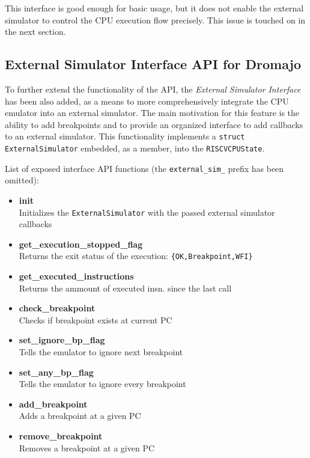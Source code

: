 \noindent
This interface is good enough for basic usage, but it does not enable the external simulator to control the CPU
execution flow precisely. This issue is touched on in the next section.

\pagebreak

\subsection{External Simulator Interface API for Dromajo}

To further extend the functionality of the API, the \textit{External Simulator Interface} has been also added, as a
means to more comprehensively integrate the CPU emulator into an external simulator. The main motivation for this
feature is the ability to add breakpoints and to provide an organized interface to add callbacks to an external
simulator. This functionality implements a \texttt{struct ExternalSimulator} embedded, as a member, into the
\texttt{RISCVCPUState}.

\vspace{10px}
\noindent
List of exposed interface API functions (the \texttt{external\_sim\_} prefix has been omitted):
\begin{multicols}{2}
    \begin{itemize}
        \item{\textbf{init}\\Initializes the \texttt{ExternalSimulator} with the passed external simulator callbacks}
        \item{\textbf{get\_execution\_stopped\_flag}\\Returns the exit status of the execution:
        \texttt{\{OK,Breakpoint,WFI\}}}
        \item{\textbf{get\_executed\_instructions}\\Returns the ammount of executed insn. since the last call}
        \item{\textbf{check\_breakpoint}\\Checks if breakpoint exists at current PC}
        \item{\textbf{set\_ignore\_bp\_flag}\\Tells the emulator to ignore next breakpoint}
        \item{\textbf{set\_any\_bp\_flag}\\Tells the emulator to ignore every breakpoint}
        \item{\textbf{add\_breakpoint}\\Adds a breakpoint at a given PC}
        \item{\textbf{remove\_breakpoint}\\Removes a breakpoint at a given PC}
    \end{itemize}
\end{multicols}

